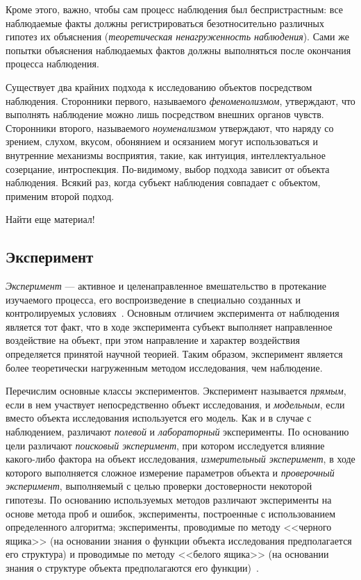 Кроме этого, важно, чтобы сам процесс наблюдения был беспристрастным:
все наблюдаемые факты должны регистрироваться безотносительно различных
гипотез их объяснения (\emph{теоретическая ненагруженность наблюдения}).
Сами же попытки объяснения наблюдаемых фактов должны выполняться после
окончания процесса наблюдения.

Существует два крайних подхода к исследованию объектов посредством наблюдения.
Сторонники первого, называемого \emph{феноменолизмом}, утверждают,
что выполнять наблюдение можно лишь посредством внешних органов чувств.
Сторонники второго, называемого \emph{ноуменализмом} утверждают,
что наряду со зрением, слухом, вкусом, обонянием и осязанием
могут использоваться и внутренние механизмы восприятия,
такие, как интуиция, интеллектуальное созерцание, интроспекция.
По-видимому, выбор подхода зависит от объекта наблюдения.
Всякий раз, когда субъект наблюдения совпадает с объектом,
применим второй подход.

{\color{red} Найти еще материал!}

\pagebreak

\subsection{Эксперимент}

\emph{Эксперимент} --- активное и целенаправленное вмешательство в протекание изучаемого процесса,
его воспроизведение в специально созданных и контролируемых условиях~\cite{nekrasov2010}.
Основным отличием эксперимента от наблюдения является тот факт, что в ходе эксперимента
субъект выполняет направленное воздействие на объект, при этом направление и характер
воздействия определяется принятой научной теорией.
Таким образом, эксперимент является более теоретически нагруженным методом исследования,
чем наблюдение.

Перечислим основные классы экспериментов.
Эксперимент называется \emph{прямым}, если в нем участвует непосредственно объект исследования,
и \emph{модельным}, если вместо объекта исследования используется его модель.
Как и в случае с наблюдением, различают \emph{полевой} и \emph{лабораторный} эксперименты.
По основанию цели различают \emph{поисковый эксперимент}, при котором исследуется влияние
какого-либо фактора на объект исследования,
\emph{измерительный эксперимент}, в ходе которого выполняется сложное измерение
параметров объекта и \textit{проверочный эксперимент}, выполняемый с целью проверки
достоверности некоторой гипотезы.
По основанию используемых методов различают эксперименты на основе метода проб и ошибок,
эксперименты, построенные с использованием определенного алгоритма;
эксперименты, проводимые по методу <<черного ящика>>
(на основании знания о функции объекта исследования предполагается его структура) и
проводимые по методу <<белого ящика>>
(на основании знания о структуре объекта предполагаются его функции)~\cite{moiseev2004}.

